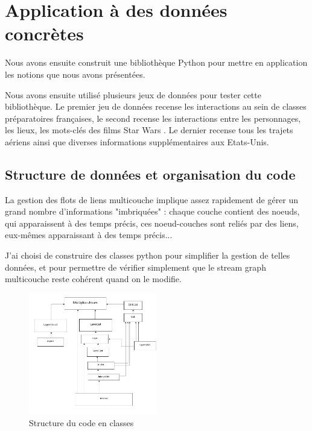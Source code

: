 \documentclass[11pt,a4paper]{article}
\theoremstyle{definition}
\theoremstyle{remark}
\theoremstyle{remark}
\begin{document}
\section{Application à des données concrètes}


Nous avons ensuite construit une bibliothèque Python \cite{github} pour mettre en application les notions que nous avons présentées.

Nous avons ensuite utilisé plusieurs jeux de données pour tester cette bibliothèque. Le premier jeu de données recense les interactions au sein de classes préparatoires françaises, le second recense les interactions entre les personnages, les lieux, les mots-clés des films \og Star Wars \fg{}. Le dernier recense tous les trajets aériens ainsi que diverses informations supplémentaires aux Etats-Unis.

\subsection{Structure de données et organisation du code} 
\label{descode}

	La gestion des flots de liens multicouche implique assez rapidement de gérer un grand nombre d'informations "imbriquées" : chaque couche contient des noeuds, qui apparaissent à des temps précis, ces noeud-couches sont reliés par des liens, eux-mêmes apparaissant à des temps précis...
	
	J'ai choisi de construire des classes python pour simplifier la gestion de telles données, et pour permettre de vérifier simplement que le stream graph multicouche reste cohérent quand on le modifie.
	
	
	
	\begin{figure}[H]
		\centering
		\includegraphics[width=0.5\textwidth]{codeStructure.JPG}
		\caption{Structure du code en classes }
	\end{figure}
	
\end{document}
